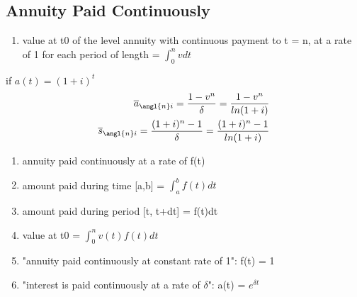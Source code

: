 \documentclass[12pt]{article}
\begin{document}
\subsection{Annuity Paid Continuously}
\begin{enumerate}
	\item value at t0 of the level annuity with continuous payment to t = n, at a rate of 1 for each period of length = $\int_{0}^{n} v dt$
\end{enumerate}
if $a(t) = (1+i)^t$
\begin{align}
	\overline{a}_{\angl{n}i} = \frac{1-v^n}{\delta} = \frac{1-v^n}{ln(1+i)} \nonumber \\
	\overline{s}_{\angl{n}i} = \frac{(1+i)^n - 1}{\delta} = \frac{(1+i)^n - 1}{ln(1+i)} \nonumber
\end{align}
\begin{enumerate}
	\item annuity paid continuously at a rate of f(t)
	\item amount paid during time [a,b] = $\int_{a}^{b} f(t)dt$
	\item amount paid during period [t, t+dt] = f(t)dt
	\item value at t0 = $\int_{0}^{n}v(t)f(t)dt$
	\item "annuity paid continuously at constant rate of 1": f(t) = 1
	\item "interest is paid continuously at a rate of $\delta$": a(t) = $e^{\delta t }$
\end{enumerate}
\end{document}
